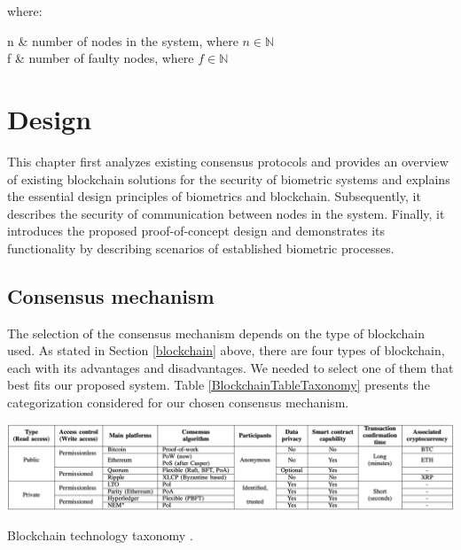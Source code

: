 where:
\begin{conditions}
 n     &  number of nodes in the system, where $n \in \mathbb{N}$\\
 f    &  number of faulty nodes, where $f \in \mathbb{N}$
\end{conditions}




\chapter{Design}
This chapter first analyzes existing consensus protocols and provides an overview of existing blockchain solutions for the security of biometric systems and explains the essential design principles of biometrics and blockchain. Subsequently, it describes the security of communication between nodes in the system. Finally, it introduces the proposed proof-of-concept design and demonstrates its functionality by describing scenarios of established biometric processes. 

\section{Consensus mechanism}
The selection of the consensus mechanism depends on the type of blockchain used. 
As stated in Section \ref{blockchain} above, there are four types of blockchain, each with its advantages and disadvantages. We needed to select one of them that best fits our proposed system. Table \ref{BlockchainTableTaxonomy} presents the categorization considered for our chosen consensus mechanism. 

\begin{table}[h]
  \label{BlockchainTableTaxonomy}
  \includegraphics[width=\linewidth]{obrazky-figures/comparisonConsensus.png}
  \caption{Blockchain technology taxonomy \cite{BlockchainMeetsBiometrics}.}
\end{table}

